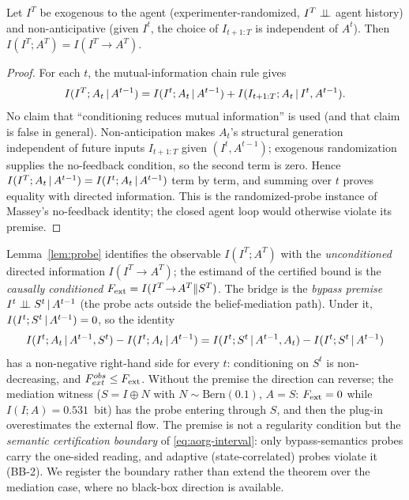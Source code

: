 \begin{lemma}[MI = DI under randomized exogenous probes]\label{lem:probe}
Let $I^T$ be exogenous to the agent (experimenter-randomized,
$I^T\perp\!\!\!\perp$ agent history) and non-anticipative (given $I^t$, the choice of
$I_{t+1:T}$ is independent of $A^t$). Then
$I(I^T;A^T)=I(I^T\!\to\!A^T)$.
\end{lemma}
\begin{proof}
For each $t$, the mutual-information chain rule gives
\[
I(I^T;A_t\,|\, A^{t-1})=I(I^t;A_t\,|\, A^{t-1})
+I(I_{t+1:T};A_t\,|\, I^t,A^{t-1}).
\]
No claim that ``conditioning reduces mutual information'' is used (and that
claim is false in general). Non-anticipation makes $A_t$'s structural
generation independent of future inputs $I_{t+1:T}$ given $(I^t,A^{t-1})$;
exogenous randomization supplies the no-feedback condition, so the second
term is zero. Hence
$I(I^T;A_t\,|\, A^{t-1})=I(I^t;A_t\,|\, A^{t-1})$ term by term, and summing
over $t$ proves equality with directed information. This is the
randomized-probe instance of Massey's no-feedback identity; the closed agent
loop would otherwise violate its premise.
\end{proof}

\begin{remark}\label{rem:probe-bridge}
Lemma~\ref{lem:probe} identifies the observable $I(I^T;A^T)$ with the
\emph{unconditioned} directed information $I(I^T\!\to\!A^T)$; the estimand of
the certified bound is the \emph{causally conditioned}
$F_{\mathrm{ext}}=I(I^T\!\to\!A^T\|S^T)$. The bridge is the \emph{bypass premise}
$I^t\perp\!\!\!\perp S^t\,|\, A^{t-1}$ (the probe acts outside the belief-mediation
path). Under it, $I(I^t;S^t\,|\, A^{t-1})=0$, so the identity
\[
I(I^t;A_t\,|\, A^{t-1},S^t)-I(I^t;A_t\,|\, A^{t-1})
= I(I^t;S^t\,|\, A^{t-1},A_t)-I(I^t;S^t\,|\, A^{t-1})
\]
has a non-negative right-hand side for every $t$: conditioning on $S^t$
is non-decreasing, and $F_{ext}^{obs}\le F_{\mathrm{ext}}$. Without the premise the
direction can reverse; the mediation witness ($S=I\oplus N$ with
$N\sim\mathrm{Bern}(0.1)$, $A=S$: $F_{\mathrm{ext}}=0$ while $I(I;A)=0.531$~bit) has the
probe entering through $S$, and then the plug-in overestimates the external
flow. The premise is not a regularity condition but the \emph{semantic
certification boundary} of \eqref{eq:aorg-interval}: only bypass-semantics
probes carry the one-sided reading, and adaptive (state-correlated) probes
violate it (BB-2). We register the boundary rather than extend the theorem
over the mediation case, where no black-box direction is available.
\end{remark}

